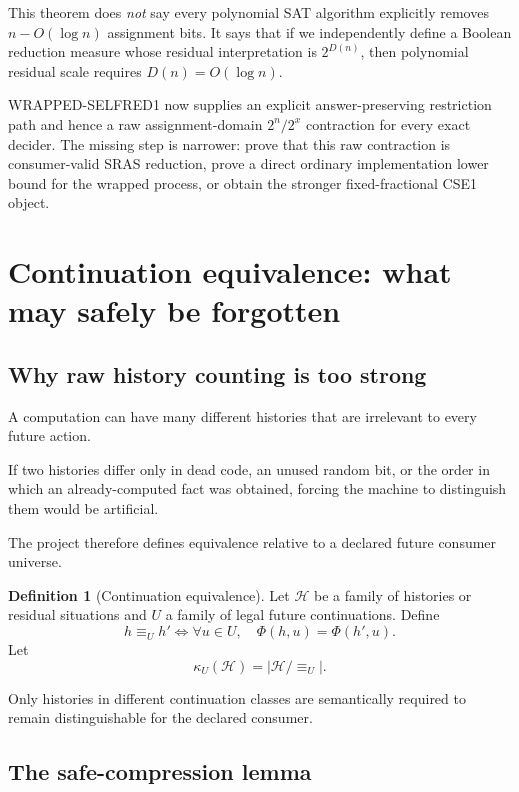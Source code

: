 \documentclass[11pt]{article}
\theoremstyle{plain}
\theoremstyle{definition}
\newtheorem{definition}[theorem]{Definition}
\theoremstyle{remark}
\begin{document}
\begin{explainbox}
This theorem does \emph{not} say every polynomial SAT algorithm explicitly
removes \(n-O(\log n)\) assignment bits.  It says that if we independently
define a Boolean reduction measure whose residual interpretation is
\(2^{D(n)}\), then polynomial residual scale requires \(D(n)=O(\log n)\).

WRAPPED-SELFRED1 now supplies an explicit answer-preserving restriction
path and hence a raw assignment-domain \(2^n/2^x\) contraction for every exact
decider.  The missing step is narrower: prove that this raw contraction is
consumer-valid SRAS reduction, prove a direct ordinary implementation lower
bound for the wrapped process, or obtain the stronger fixed-fractional CSE1
object.
\end{explainbox}

\section{Continuation equivalence: what may safely be forgotten}

\subsection{Why raw history counting is too strong}

A computation can have many different histories that are irrelevant to every
future action.

If two histories differ only in dead code, an unused random bit, or the order
in which an already-computed fact was obtained, forcing the machine to
distinguish them would be artificial.

The project therefore defines equivalence relative to a declared future
consumer universe.

\begin{definition}[Continuation equivalence]
Let \(\mathcal H\) be a family of histories or residual situations and \(U\) a
family of legal future continuations.  Define
\[
h\equiv_U h'
\iff
\forall u\in U,\quad
\Phi(h,u)=\Phi(h',u).
\]
Let
\[
\kappa_U(\mathcal H)
=
|\mathcal H/\!\equiv_U|.
\]
\end{definition}

Only histories in different continuation classes are semantically required to
remain distinguishable for the declared consumer.

\subsection{The safe-compression lemma}
\end{document}
